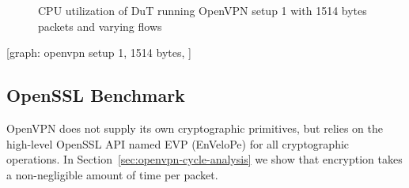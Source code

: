 \documentclass[IN,11pt,twoside,openright,master,english]{tumthesis}
\begin{document}
\begin{figure}[h]
	\centering
	
	\caption{CPU utilization of DuT running OpenVPN setup 1 with 1514 bytes packets and varying flows}
	\label{fig:openvpn-setup1-1510-byte-cpu-util}
\end{figure}

[graph: openvpn setup 1, 1514 bytes, ]

\subsection{OpenSSL Benchmark}
OpenVPN does not supply its own cryptographic primitives, but relies on the high-level OpenSSL API named EVP (EnVeloPe) for all cryptographic operations.
In Section~\ref{sec:openvpn-cycle-analysis} we show that encryption takes a non-negligible amount of time per packet.
\end{document}
